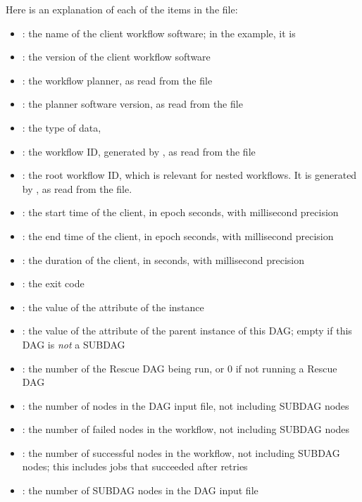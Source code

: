 Here is an explanation of each of the items in the file:
\begin{itemize}
\item {}: the name of the client workflow software;
in the example, it is 
\item {}: the version of the client workflow software
\item {}: the workflow planner,
as read from the  file
\item {}: the planner software version,
as read from the  file
\item {}: the type of data,  
\item {}: the workflow ID, 
generated by , as read from the  file
\item {}: the root workflow ID,
which is relevant for nested workflows.
It is generated by , 
as read from the  file.
\item {}: the start time of the client,
in epoch seconds, with millisecond precision
\item {}: the end time of the client,
in epoch seconds, with millisecond precision
\item {}: the duration of the client,
in seconds, with millisecond precision
\item {}: the  exit code
\item {}: the value of the  attribute 
of the  instance
\item {}: the value of the  attribute 
of the parent  instance of this DAG;
empty if this DAG is \emph{not} a SUBDAG
\item {}: the number of the Rescue DAG being run,
or 0 if not running a Rescue DAG
\item {}: the number of nodes in the DAG input file,
not including SUBDAG nodes
\item {}: the number of failed nodes in the workflow,
not including SUBDAG nodes
\item {}: the number of successful nodes in the
workflow, not including SUBDAG nodes; 
this includes jobs that succeeded after retries
\item {}: the number of SUBDAG nodes in the DAG input file

\end{itemize}
